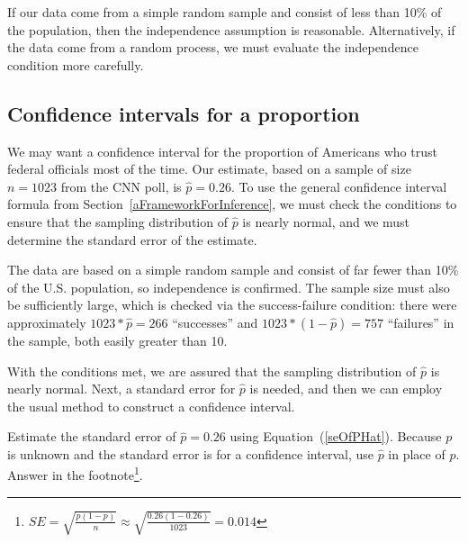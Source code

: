 \begin{tipBox}{
If our data come from a simple random sample and consist of less than 10\% of the population, then the independence assumption is reasonable. Alternatively, if the data come from a random process, we must evaluate the independence condition more carefully.}
\end{tipBox}

\subsection{Confidence intervals for a proportion}
\label{confIntForPropSection}

We may want a confidence interval for the proportion of Americans who trust federal officials most of the time. Our estimate, based on a sample of size $n = 1023$ from the CNN poll, is $\hat{p} = 0.26$. To use the general confidence interval formula from Section~\ref{aFrameworkForInference}, we must check the conditions to ensure that the sampling distribution of $\hat{p}$ is nearly normal, and we must determine the standard error of the estimate.

The data are based on a simple random sample and consist of far fewer than 10\% of the U.S. population, so independence is confirmed. The sample size must also be sufficiently large, which is checked via the success-failure condition: there were approximately $1023*\hat{p}=266$ ``successes'' and $1023*(1-\hat{p})=757$ ``failures'' in the sample, both easily greater than 10.

With the conditions met, we are assured that the sampling distribution of $\hat{p}$ is nearly normal. Next, a standard error for $\hat{p}$ is needed, and then we can employ the usual method to construct a confidence interval.

\begin{exercise} \label{seOfPropOfAmericansWhoDoNotTrustFedOfficials}
Estimate the standard error of $\hat{p}=0.26$ using Equation~(\ref{seOfPHat}). Because $p$ is unknown and the standard error is for a confidence interval, use $\hat{p}$ in place of $p$.  Answer in the footnote\footnote{$SE = \sqrt{\frac{p(1-p)}{n}} \approx \sqrt{\frac{0.26(1-0.26)}{1023}} = 0.014$}.
\end{exercise}

